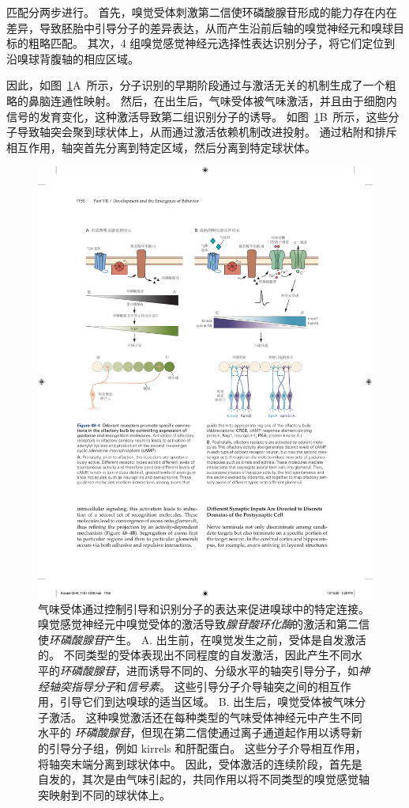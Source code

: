 匹配分两步进行。
首先，嗅觉受体刺激第二信使环磷酸腺苷形成的能力存在内在差异，导致胚胎中引导分子的差异表达，从而产生沿前后轴的嗅觉神经元和嗅球目标的粗略匹配。
其次，4 组嗅觉感觉神经元选择性表达识别分子，将它们定位到沿嗅球背腹轴的相应区域。


因此，如图~\ref{fig:48_4}A~所示，分子识别的早期阶段通过与激活无关的机制生成了一个粗略的鼻脑连通性映射。
然后，在出生后，气味受体被气味激活，并且由于细胞内信号的发育变化，这种激活导致第二组识别分子的诱导。
如图~\ref{fig:48_4}B~所示，这些分子导致轴突会聚到球状体上，从而通过激活依赖机制改进投射。
通过粘附和排斥相互作用，轴突首先分离到特定区域，然后分离到特定球状体。


\begin{figure}[htbp]
	\centering
	\includegraphics[width=1.0\linewidth]{chap48/fig_48_4}
	\caption{气味受体通过控制引导和识别分子的表达来促进嗅球中的特定连接。
		嗅觉感觉神经元中嗅觉受体的激活导致\textit{腺苷酸环化酶}的激活和第二信使\textit{环磷酸腺苷}产生。
		A. 出生前，在嗅觉发生之前，受体是自发激活的。
		不同类型的受体表现出不同程度的自发激活，因此产生不同水平的\textit{环磷酸腺苷}，进而诱导不同的、分级水平的轴突引导分子，如\textit{神经轴突指导分子}和\textit{信号素}。
		这些引导分子介导轴突之间的相互作用，引导它们到达嗅球的适当区域。
		B. 出生后，嗅觉受体被气味分子激活。
		这种嗅觉激活还在每种类型的气味受体神经元中产生不同水平的 \textit{环磷酸腺苷}，但现在第二信使通过离子通道起作用以诱导新的引导分子组，例如 kirrels 和肝配蛋白。
		这些分子介导相互作用，将轴突末端分离到球状体中。
		因此，受体激活的连续阶段，首先是自发的，其次是由气味引起的，共同作用以将不同类型的嗅觉感觉轴突映射到不同的球状体上。}
	\label{fig:48_4}
\end{figure}



